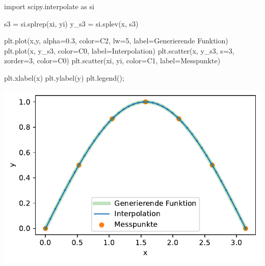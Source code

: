 \documentclass[
  letterpaper,
  DIV=11,
  numbers=noendperiod]{scrreprt}
\newenvironment{Shaded}{\begin{snugshade}}{\end{snugshade}}
\newcommand{\DecValTok}[1]{\textcolor[rgb]{0.68,0.00,0.00}{#1}}
\newcommand{\FloatTok}[1]{\textcolor[rgb]{0.68,0.00,0.00}{#1}}
\newcommand{\ImportTok}[1]{\textcolor[rgb]{0.00,0.46,0.62}{#1}}
\newcommand{\NormalTok}[1]{\textcolor[rgb]{0.00,0.23,0.31}{#1}}
\newcommand{\OperatorTok}[1]{\textcolor[rgb]{0.37,0.37,0.37}{#1}}
\newcommand{\StringTok}[1]{\textcolor[rgb]{0.13,0.47,0.30}{#1}}
\begin{document}
\begin{Shaded}
\begin{Highlighting}[]
\ImportTok{import}\NormalTok{ scipy.interpolate }\ImportTok{as}\NormalTok{ si}
\end{Highlighting}
\end{Shaded}

\begin{Shaded}
\begin{Highlighting}[]
\NormalTok{s3 }\OperatorTok{=}\NormalTok{ si.splrep(xi, yi)}
\NormalTok{y\_s3 }\OperatorTok{=}\NormalTok{ si.splev(x, s3)}
\end{Highlighting}
\end{Shaded}

\begin{Shaded}
\begin{Highlighting}[]
\NormalTok{plt.plot(x,y, alpha}\OperatorTok{=}\FloatTok{0.3}\NormalTok{, color}\OperatorTok{=}\StringTok{\textquotesingle{}C2\textquotesingle{}}\NormalTok{, lw}\OperatorTok{=}\DecValTok{5}\NormalTok{, }
\NormalTok{         label}\OperatorTok{=}\StringTok{\textquotesingle{}Generierende Funktion\textquotesingle{}}\NormalTok{)}
\NormalTok{plt.plot(x, y\_s3, color}\OperatorTok{=}\StringTok{\textquotesingle{}C0\textquotesingle{}}\NormalTok{, label}\OperatorTok{=}\StringTok{\textquotesingle{}Interpolation\textquotesingle{}}\NormalTok{)}
\NormalTok{plt.scatter(x, y\_s3, s}\OperatorTok{=}\DecValTok{3}\NormalTok{, zorder}\OperatorTok{=}\DecValTok{3}\NormalTok{, color}\OperatorTok{=}\StringTok{\textquotesingle{}C0\textquotesingle{}}\NormalTok{)}
\NormalTok{plt.scatter(xi, yi, color}\OperatorTok{=}\StringTok{\textquotesingle{}C1\textquotesingle{}}\NormalTok{, label}\OperatorTok{=}\StringTok{\textquotesingle{}Messpunkte\textquotesingle{}}\NormalTok{)}

\NormalTok{plt.xlabel(}\StringTok{\textquotesingle{}x\textquotesingle{}}\NormalTok{)}
\NormalTok{plt.ylabel(}\StringTok{\textquotesingle{}y\textquotesingle{}}\NormalTok{)}
\NormalTok{plt.legend()}\OperatorTok{;}
\end{Highlighting}
\end{Shaded}

\includegraphics{books/dataanalysis/splines_files/figure-pdf/cell-9-output-1.pdf}
\end{document}
